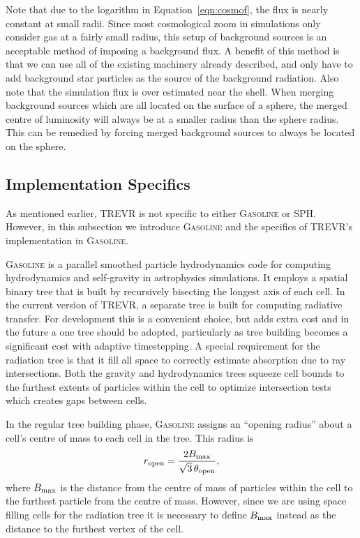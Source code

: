 \documentclass[fleq,usenatbib]{mnras}
\newcommand{\acro}{TREVR}
\newcommand{\tO}{\theta_{\rm open}}
\begin{document}
{Note that due to the logarithm in Equation~\ref{eqn:cosmof}, the flux is 
nearly constant at small radii. Since most cosmological zoom in simulations 
only consider gas at a fairly small radius, this setup of background sources 
is an acceptable method of imposing a background flux. A benefit of this 
method is that we can use all of the existing machinery already described, and 
only have to add background star particles as the source of the 
background radiation. Also note that the simulation flux is over estimated 
near the shell.  When merging 
background sources which are all located on the surface of a sphere, the 
merged centre of luminosity will always be at a smaller radius than the sphere 
radius. This can be remedied by forcing merged background sources to always be 
located on the sphere. 

\subsection{Implementation Specifics}\label{sec:specs}
As mentioned earlier, \acro{} is not specific to either \textsc{Gasoline} or 
SPH.  However, in this subsection we 
introduce \textsc{Gasoline} and the specifics of \acro{}'s implementation in 
\textsc{Gasoline}.

\textsc{Gasoline} is a parallel smoothed particle hydrodynamics code for 
computing hydrodynamics and self-gravity in astrophysics simulations. It 
employs a spatial binary tree that is built by recursively bisecting the 
longest axis of each cell. In the current version of \acro{}, a separate tree 
is built for computing radiative transfer. For development this is a 
convenient choice, but adds extra cost and in the future a one tree
should be adopted, particularly as tree building becomes a significant cost
with adaptive timestepping.
A special requirement for the radiation tree
is that it fill all space to correctly estimate absorption due to ray intersections.
Both the gravity and hydrodynamics trees 
squeeze cell bounds to the furthest
extents of particles within the cell to optimize intersection tests which creates
gaps between cells.

In the regular tree building phase, \textsc{Gasoline} assigns an ``opening 
radius'' about a cell's centre of mass to each cell in the tree. This radius is
\begin{equation}
r_{\rm open} = \frac{2 B_{\rm max}}{\sqrt{3}\, \tO},
\end{equation}
where $B_{\rm max}$ is the  distance from the centre of mass of particles 
within the cell to the furthest particle from the centre of mass. However, 
since we are using space filling cells for the radiation tree it is necessary 
to define $B_{\rm max}$ instead as the distance to the furthest vertex of the 
cell.

}
\end{document}
